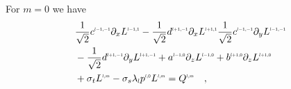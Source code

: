 For $m=0$ we have
\begin{align}
&
\frac{1}{\sqrt{2}}c^{\scaleto{l-1,-1}{4pt}}\partial_x L^{\scaleto{l-1,1}{4pt}}
-\frac{1}{\sqrt{2}}d^{\scaleto{l+1,-1}{4pt}}\partial_x L^{\scaleto{l+1,1}{4pt}}
\frac{1}{\sqrt{2}}c^{\scaleto{l-1,-1}{4pt}}\partial_y L^{\scaleto{l-1,-1}{4pt}}
\nonumber
\\&
-\frac{1}{\sqrt{2}}d^{\scaleto{l+1,-1}{4pt}}\partial_y L^{\scaleto{l+1,-1}{4pt}}
+a^{\scaleto{l-1,0}{4pt}}\partial_z L^{\scaleto{l-1,0}{4pt}}
+b^{\scaleto{l+1,0}{4pt}}\partial_z L^{\scaleto{l+1,0}{4pt}}
\nonumber
\\&
+\sigma_t L^{\scaleto{l,m}{4pt}}
-\sigma_s\lambda_{\scaleto{l}{4pt}}p^{\scaleto{l,0}{4pt}}L^{\scaleto{l,m}{4pt}}
= Q^{\scaleto{l,m}{4pt}}\quad ,
\label{eq:rpn_m_=_z}
\end{align}


